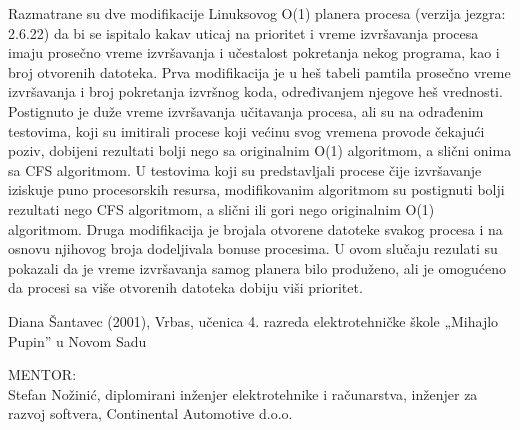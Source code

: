 \begin{Abstract}
Razmatrane su dve modifikacije Linuksovog O(1) planera procesa (verzija jezgra: 2.6.22) da bi se ispitalo kakav uticaj na prioritet i vreme izvršavanja procesa imaju prosečno vreme izvršavanja i učestalost pokretanja nekog programa, kao i broj otvorenih datoteka. Prva modifikacija je u heš tabeli pamtila prosečno vreme izvršavanja i broj pokretanja izvršnog koda, određivanjem njegove heš vrednosti. Postignuto je duže vreme izvršavanja učitavanja procesa, ali su na odrađenim testovima, koji su imitirali procese koji većinu svog vremena provode čekajući poziv, dobijeni rezultati bolji nego sa originalnim O(1) algoritmom, a slični onima sa CFS algoritmom. U testovima koji su predstavljali procese čije izvršavanje iziskuje puno procesorskih resursa, modifikovanim algoritmom su postignuti bolji rezultati nego CFS algoritmom, a slični ili gori nego originalnim O(1) algoritmom. Druga modifikacija je brojala otvorene datoteke svakog procesa i na osnovu njihovog broja dodeljivala bonuse procesima. U ovom slučaju rezulati su pokazali da je vreme izvršavanja samog planera bilo produženo, ali je omogućeno da procesi sa više otvorenih datoteka dobiju viši prioritet.
\end{Abstract}
\begin{AuthorEx}
Diana Šantavec (2001), Vrbas, učenica 4. razreda elektrotehničke škole „Mihajlo Pupin” u Novom Sadu

MENTOR:\\
Stefan Nožinić, diplomirani inženjer elektrotehnike i računarstva, inženjer za razvoj softvera, Continental Automotive d.o.o.
\end{AuthorEx}
